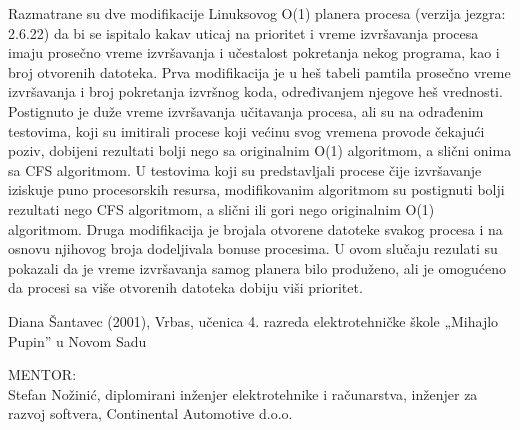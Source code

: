 \begin{Abstract}
Razmatrane su dve modifikacije Linuksovog O(1) planera procesa (verzija jezgra: 2.6.22) da bi se ispitalo kakav uticaj na prioritet i vreme izvršavanja procesa imaju prosečno vreme izvršavanja i učestalost pokretanja nekog programa, kao i broj otvorenih datoteka. Prva modifikacija je u heš tabeli pamtila prosečno vreme izvršavanja i broj pokretanja izvršnog koda, određivanjem njegove heš vrednosti. Postignuto je duže vreme izvršavanja učitavanja procesa, ali su na odrađenim testovima, koji su imitirali procese koji većinu svog vremena provode čekajući poziv, dobijeni rezultati bolji nego sa originalnim O(1) algoritmom, a slični onima sa CFS algoritmom. U testovima koji su predstavljali procese čije izvršavanje iziskuje puno procesorskih resursa, modifikovanim algoritmom su postignuti bolji rezultati nego CFS algoritmom, a slični ili gori nego originalnim O(1) algoritmom. Druga modifikacija je brojala otvorene datoteke svakog procesa i na osnovu njihovog broja dodeljivala bonuse procesima. U ovom slučaju rezulati su pokazali da je vreme izvršavanja samog planera bilo produženo, ali je omogućeno da procesi sa više otvorenih datoteka dobiju viši prioritet.
\end{Abstract}
\begin{AuthorEx}
Diana Šantavec (2001), Vrbas, učenica 4. razreda elektrotehničke škole „Mihajlo Pupin” u Novom Sadu

MENTOR:\\
Stefan Nožinić, diplomirani inženjer elektrotehnike i računarstva, inženjer za razvoj softvera, Continental Automotive d.o.o.
\end{AuthorEx}
